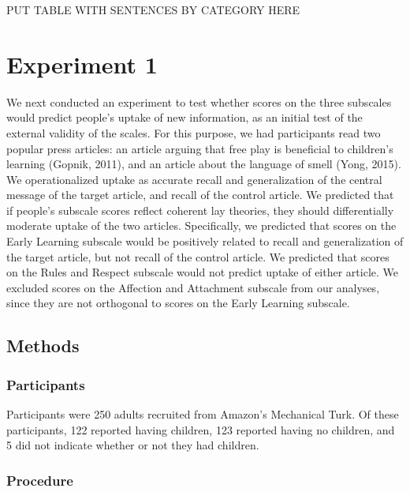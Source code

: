 \documentclass[10pt, letterpaper]{article}
\begin{document}
PUT TABLE WITH SENTENCES BY CATEGORY HERE

\section{Experiment 1}\label{experiment-1}

We next conducted an experiment to test whether scores on the three
subscales would predict people's uptake of new information, as an
initial test of the external validity of the scales. For this purpose,
we had participants read two popular press articles: an article arguing
that free play is beneficial to children's learning (Gopnik, 2011), and
an article about the language of smell (Yong, 2015). We operationalized
uptake as accurate recall and generalization of the central message of
the target article, and recall of the control article. We predicted that
if people's subscale scores reflect coherent lay theories, they should
differentially moderate uptake of the two articles. Specifically, we
predicted that scores on the Early Learning subscale would be positively
related to recall and generalization of the target article, but not
recall of the control article. We predicted that scores on the Rules and
Respect subscale would not predict uptake of either article. We excluded
scores on the Affection and Attachment subscale from our analyses, since
they are not orthogonal to scores on the Early Learning subscale.

\subsection{Methods}\label{methods}

\subsubsection{Participants}\label{participants}

Participants were 250 adults recruited from Amazon's Mechanical Turk. Of
these participants, 122 reported having children, 123 reported having no
children, and 5 did not indicate whether or not they had children.

\subsubsection{Procedure}\label{procedure}
\end{document}
